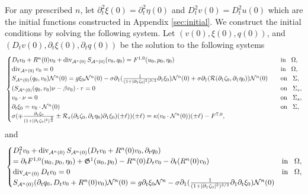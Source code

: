 \documentclass[letterpaper,reqno,10pt,twoside]{amsart}
\theoremstyle{definition}
\theoremstyle{remark}
\def\p{\partial}
\begin{document}
\begin{appendix}
			For any prescribed $n$, let $\p_{t}^{2}\xi(0)=\p_{t}^{2}\eta(0)$ and $D_{t}^{2}v(0)=D_{t}^{2}u(0)$ which are the initial functions constructed in Appendix \ref{sec:initial}. We construct the initial conditions by solving the following system. Let $(v(0),\xi(0),q(0))$, and $(D_{t}v(0),\p_{t}\xi(0),\p_{t}q(0))$ be the solution to the following systems
			\begin{align}{\label{eq:smooth_n0}}
				\begin{cases}
					D_{t}v_{0}+R^{n}(0)v_{0}+\operatorname{div}_{\mathcal{A}^{n}(0)}S_{\mathcal{A}^{n}(0)}(v_{0},q_{0})=F^{1,0}(u_{0},p_{0},\eta_{0})~~~&\operatorname{in}~~\Omega,\\
					\operatorname{div}_{\mathcal{A}^{n}(0)}v_{0}=0~~~&\operatorname{in}~~\Omega,\\
					S_{\mathcal{A}^{n}(0)}(q_{0},v_{0})\mathcal{N}^{n}(0)=g\xi_{0}\mathcal{N}^{n}(0)-\sigma\partial_{1}(\frac{1}{(1+\vert \partial_{1}\zeta_{0}\vert^{2})^{3/2}}\partial_{1}\xi_{0})\mathcal{N}^{n}(0)
					+\sigma\partial_{1}(\mathcal{R}(\partial_{1}\zeta_{0},\partial_{1}\eta_{0}))\mathcal{N}^{n}(0)~~~&\operatorname{on}~~\Sigma,\\
					(S_{\mathcal{A}^{n}(0)}(q_{0},v_{0})\nu-\beta v_{0})\cdot \tau=0~~~&\operatorname{on}~~\Sigma_{s},\\
					v_{0}\cdot \nu=0~~~&\operatorname{on}~~\Sigma_{s},\\
					\partial_{t}\xi_{0}=v_{0}\cdot \mathcal{N}^{n}(0)~~~&\operatorname{on}~~\Sigma,\\
					\sigma(\mp \frac{\partial_{1}\xi_{0}}{(1+\vert \partial_{1}\zeta_{0}\vert^{2})^{\frac{3}{2}}}\pm \mathcal{R}_{z}(\partial_{1}\zeta_{0},\partial_{1}\eta_{0})\partial_{1}\xi_{0})(\pm \ell))(\pm\ell)=\kappa (v_{0}\cdot \mathcal{N}^{n}(0))(\pm \ell)-{F}^{7,0},
				\end{cases}
			\end{align}
			\noindent and
			\begin{align}{\label{eq:smooth_n1}}
				\begin{cases}
					D_{t}^{2}v_{0}+\operatorname{div}_{\mathcal{A}^{n}(0)}S_{\mathcal{A}^{n}(0)}(D_{t}v_{0}+R^{n}(0)v_{0},\p_{t}q_{0})\\
					=\p_{t}F^{1,0}(u_{0},p_{0},\eta_{0})+\mathfrak{G}^{1}(u_{0},p_{0})-R^{n}(0)D_{t}v_{0}-\p_{t}(R^{n}(0)v_{0})~~~&\operatorname{in}~~\Omega,\\
					\operatorname{div}_{\mathcal{A}^{n}(0)}D_{t}v_{0}=0~~~&\operatorname{in}~~\Omega,\\
					S_{\mathcal{A}^{n}(0)}(\p_{t}q_{0},D_{t}v_{0}+R^{n}(0)v_{0})\mathcal{N}^{n}(0)=g\p_{t}\xi_{0}\mathcal{N}^{n}-\sigma\partial_{1}(\frac{1}{(1+\vert \partial_{1}\zeta_{0}\vert^{2})^{3/2}}\partial_{1}\p_{t}\xi_{0})\mathcal{N}^{n}(0)

\end{cases}
\end{align}
\end{appendix}
\end{document}
